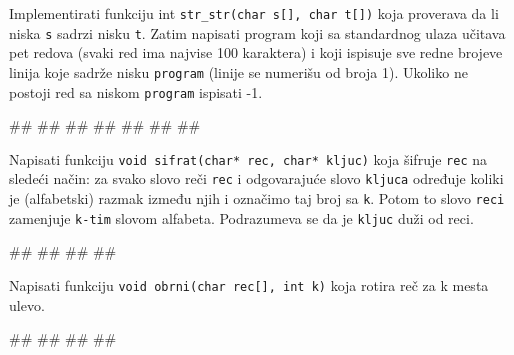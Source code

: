 \begin{Exercise}[label=p2.3_] 
Implementirati funkciju int \verb|str_str(char s[], char t[])| koja
proverava da li niska \verb|s| sadrzi nisku \verb|t|. Zatim napisati
program koji sa standardnog ulaza u\v{c}itava pet redova (svaki red
ima najvise 100 karaktera) i koji ispisuje sve redne brojeve linija
koje sadr\v ze nisku \verb|program| (linije se numeri\v{s}u od broja
1). Ukoliko ne postoji red sa niskom \verb|program| ispisati -1. \\
\begin{miditest}
\begin{upotreba}{1}
#\naslovInt#
##
##
##
##
##
##
\end{upotreba}
\end{miditest}
\end{Exercise}
\begin{Answer}[ref=p2.3_]
\end{Answer}

\begin{Exercise}[label=p2.3_] 
Napisati funkciju \verb|void sifrat(char* rec, char* kljuc)| koja \v
sifruje \verb|rec| na slede\' ci na\v cin: za svako slovo re\v ci
\verb|rec| i odgovaraju\' ce slovo \verb|kljuca| određuje koliki je
(alfabetski) razmak između njih i ozna\v cimo taj broj sa \verb|k|.
Potom to slovo \verb|reci| zamenjuje \verb|k-tim| slovom alfabeta.
Podrazumeva se da je \verb|kljuc| du\v zi od reci. \\ 
\begin{miditest}
\begin{upotreba}{1}
#\naslovInt#
##
##
##
\end{upotreba}
\end{miditest}
\end{Exercise}
\begin{Answer}[ref=p2.3_]
\end{Answer}


\begin{Exercise}[label=p2.3_] 
Napisati funkciju \verb|void obrni(char rec[], int k)| koja rotira
re\v c za k mesta ulevo.
\begin{miditest}
\begin{upotreba}{1}
#\naslovInt#
##
##
##
\end{upotreba}
\end{miditest}
\end{Exercise}
\begin{Answer}[ref=p2.3_]
\end{Answer}


